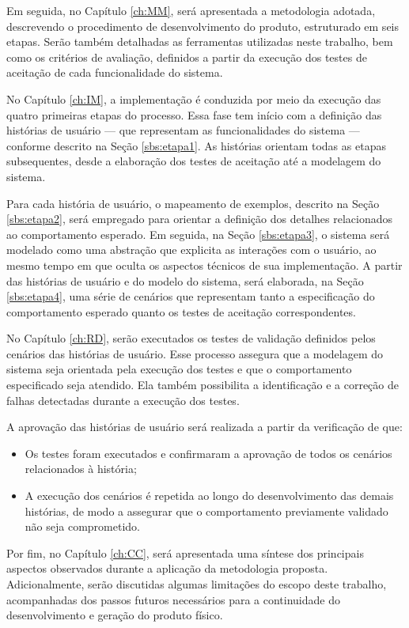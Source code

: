 Em seguida, no Capítulo \ref{ch:MM}, será apresentada a metodologia adotada, descrevendo o procedimento de desenvolvimento do produto, estruturado em seis etapas. 
Serão também detalhadas as ferramentas utilizadas neste trabalho, bem como os critérios de avaliação, definidos a partir da execução dos testes de aceitação de 
cada funcionalidade do sistema.

No Capítulo \ref{ch:IM}, a implementação é conduzida por meio da execução das quatro primeiras etapas do processo. Essa fase tem início com a definição das histórias 
de usuário — que representam as funcionalidades do sistema — conforme descrito na Seção \ref{sbs:etapa1}. As histórias orientam todas as etapas subsequentes, desde a 
elaboração dos testes de aceitação até a modelagem do sistema.

Para cada história de usuário, o mapeamento de exemplos, descrito na Seção \ref{sbs:etapa2}, será empregado para orientar a definição dos detalhes relacionados 
ao comportamento esperado. Em seguida, na Seção \ref{sbs:etapa3}, o sistema será modelado como uma abstração que explicita as interações com o usuário, ao mesmo 
tempo em que oculta os aspectos técnicos de sua implementação. A partir das histórias de usuário e do modelo do sistema, será elaborada, na Seção \ref{sbs:etapa4}, 
uma série de cenários que representam tanto a especificação do comportamento esperado quanto os testes de aceitação correspondentes.  

No Capítulo \ref{ch:RD}, serão executados os testes de validação definidos pelos cenários das histórias de usuário. Esse processo assegura que a modelagem do sistema 
seja orientada pela execução dos testes e que o comportamento especificado seja atendido. Ela também possibilita a identificação e a correção de falhas detectadas 
durante a execução dos testes.

A aprovação das histórias de usuário será realizada a partir da verificação de que:

\begin{itemize}
    \item Os testes foram executados e confirmaram a aprovação de todos os cenários relacionados à história;
    \item A execução dos cenários é repetida ao longo do desenvolvimento das demais histórias, de modo a assegurar que o comportamento previamente validado não seja comprometido.
\end{itemize}

Por fim, no Capítulo \ref{ch:CC}, será apresentada uma síntese dos principais aspectos observados durante a aplicação da metodologia proposta. Adicionalmente, serão 
discutidas algumas limitações do escopo deste trabalho, acompanhadas dos passos futuros necessários para a continuidade do desenvolvimento e geração 
do produto físico.
